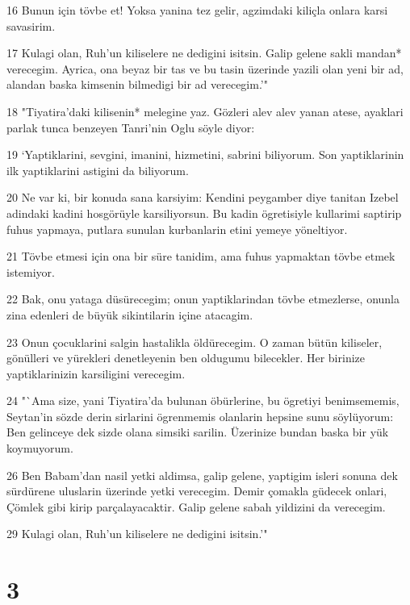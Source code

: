 \par 16 Bunun için tövbe et! Yoksa yanina tez gelir, agzimdaki kiliçla onlara karsi savasirim.
\par 17 Kulagi olan, Ruh'un kiliselere ne dedigini isitsin. Galip gelene sakli mandan* verecegim. Ayrica, ona beyaz bir tas ve bu tasin üzerinde yazili olan yeni bir ad, alandan baska kimsenin bilmedigi bir ad verecegim.'"
\par 18 "Tiyatira'daki kilisenin* melegine yaz. Gözleri alev alev yanan atese, ayaklari parlak tunca benzeyen Tanri'nin Oglu söyle diyor:
\par 19 `Yaptiklarini, sevgini, imanini, hizmetini, sabrini biliyorum. Son yaptiklarinin ilk yaptiklarini astigini da biliyorum.
\par 20 Ne var ki, bir konuda sana karsiyim: Kendini peygamber diye tanitan Izebel adindaki kadini hosgörüyle karsiliyorsun. Bu kadin ögretisiyle kullarimi saptirip fuhus yapmaya, putlara sunulan kurbanlarin etini yemeye yöneltiyor.
\par 21 Tövbe etmesi için ona bir süre tanidim, ama fuhus yapmaktan tövbe etmek istemiyor.
\par 22 Bak, onu yataga düsürecegim; onun yaptiklarindan tövbe etmezlerse, onunla zina edenleri de büyük sikintilarin içine atacagim.
\par 23 Onun çocuklarini salgin hastalikla öldürecegim. O zaman bütün kiliseler, gönülleri ve yürekleri denetleyenin ben oldugumu bilecekler. Her birinize yaptiklarinizin karsiligini verecegim.
\par 24 "`Ama size, yani Tiyatira'da bulunan öbürlerine, bu ögretiyi benimsememis, Seytan'in sözde derin sirlarini ögrenmemis olanlarin hepsine sunu söylüyorum: Ben gelinceye dek sizde olana simsiki sarilin. Üzerinize bundan baska bir yük koymuyorum.
\par 26 Ben Babam'dan nasil yetki aldimsa, galip gelene, yaptigim isleri sonuna dek sürdürene uluslarin üzerinde yetki verecegim. Demir çomakla güdecek onlari, Çömlek gibi kirip parçalayacaktir. Galip gelene sabah yildizini da verecegim.
\par 29 Kulagi olan, Ruh'un kiliselere ne dedigini isitsin.'"

\chapter{3}

